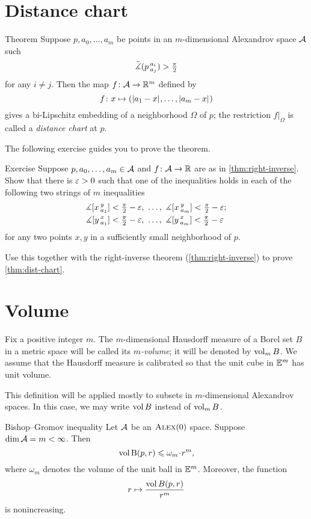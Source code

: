 \section{Distance chart}

\begin{thm}{Theorem}\label{thm:dist-chart}
Suppose $p,a_0,\dots,a_m$ be points in an $m$-dimensional Alexandrov space $\mathcal{A}$ such
\[\tilde\measuredangle(p\,{}^{a_i}_{a_j})>\tfrac\pi2\]
for any $i\ne j$.
Then the map $f\colon\mathcal{A}\to\mathbb{R}^m$ defined by
\[f\colon x\mapsto (|{a_1}-{x}|_{}^{{}},\dots,|{a_m}-{x}|_{}^{{}})\]
gives a bi-Lipschitz embedding of a neighborhood $\Omega$ of $p$;
the restriction $f|_\Omega$ is called a  \emph{distance chart} at $p$.
\end{thm}

The following exercise guides you to prove the theorem.

\begin{thm}{Exercise}\label{ex:proof-dist-chart}
Suppose $p,a_0,\dots,a_m\in\mathcal{A}$ and $f\colon\mathcal{A}\to\mathbb{R}$ are as in \ref{thm:right-inverse}.
Show that there is $\varepsilon>0$ such that one of the inequalities holds in each of the following two strings of $m$  inequalities
\begin{align*}
\measuredangle[x\,{}^{y}_{a_1}]&<\tfrac\pi2-\varepsilon,\ \dots,\  \measuredangle[x\,{}^{y}_{a_m}]<\tfrac\pi2-\varepsilon;
\\
\measuredangle[y\,{}^{x}_{a_1}]&<\tfrac\pi2-\varepsilon,\ \dots,\ \measuredangle[y\,{}^{x}_{a_m}]<\tfrac\pi2-\varepsilon
\end{align*}
for any two points $x,y$ in a sufficiently small neighborhood of $p$.

Use this together with the right-inverse theorem (\ref{thm:right-inverse}) to prove \ref{thm:dist-chart}.
\end{thm}

\section{Volume}

Fix a positive integer $m$.
The $m$-dimensional Hausdorff measure of a Borel set $B$ in a metric space will be called its \emph{$m$-volume}; it will be denoted by $\operatorname{\rm vol}\nolimits_m B$.
We assume that the Hausdorff measure is calibrated so that the unit cube in $\mathbb{E}^m$ has unit volume.

This definition will be applied mostly to subsets in $m$-dimensional Alexandrov spaces.
In this case, we may write $\operatorname{\rm vol}\nolimits B$ instead of $\operatorname{\rm vol}\nolimits_m B$.


\begin{thm}{Bishop--Gromov inequality}\label{inq:BG}
Let $\mathcal{A}$ be an $\textsc{Alex}(0)$ space.
Suppose $\operatorname{\rm dim}\nolimits \mathcal{A}=m<\infty$.
Then 
\[\vol \oBall(p,r)\le \omega_m\cdot r^m,\]
where $\omega_m$ denotes the volume of the unit ball in $\mathbb{E}^m$.
Moreover, the function 
\[r\mapsto \frac{\operatorname{\rm vol}\nolimits B(p,r)}{r^m}\]
is nonincreasing.
\end{thm}

